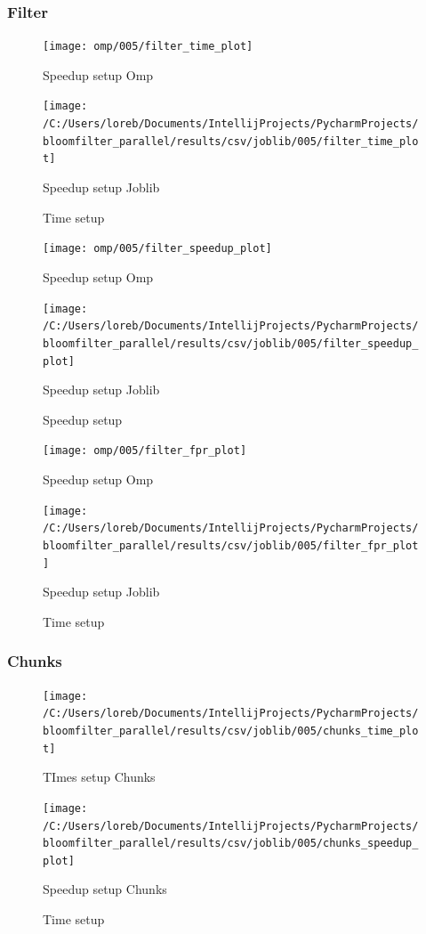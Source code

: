 \documentclass[11pt]{article}
\begin{document}
    \subsubsection{Filter}\label{subsubsec:fpr-005-filter}
    \begin{figure}[H]
        \centering
        \texttt{[image: omp/005/filter\_time\_plot]}
            \caption{Speedup setup Omp}\label{fig:005-filter_time_omp}
        \endminipage\hfill
        \texttt{[image: /C:/Users/loreb/Documents/IntellijProjects/PycharmProjects/bloomfilter\_parallel/results/csv/joblib/005/filter\_time\_plot]}
            \caption{Speedup setup Joblib}\label{fig:005-filter_time_joblib}
        \endminipage\hfill
        \caption{Time setup}
    \end{figure}
    \begin{figure}[H]
        \centering
        \texttt{[image: omp/005/filter\_speedup\_plot]}
            \caption{Speedup setup Omp}\label{fig:005-filter_speedup_omp}
        \endminipage\hfill
        \texttt{[image: /C:/Users/loreb/Documents/IntellijProjects/PycharmProjects/bloomfilter\_parallel/results/csv/joblib/005/filter\_speedup\_plot]}
            \caption{Speedup setup Joblib}\label{fig:005-filter_speedup_joblib}
        \endminipage\hfill
        \caption{Speedup setup}
    \end{figure}
    \begin{figure}[H]
        \centering
        \texttt{[image: omp/005/filter\_fpr\_plot]}
            \caption{Speedup setup Omp}\label{fig:005-filter_fpr_omp}
        \endminipage\hfill
        \texttt{[image: /C:/Users/loreb/Documents/IntellijProjects/PycharmProjects/bloomfilter\_parallel/results/csv/joblib/005/filter\_fpr\_plot]}
            \caption{Speedup setup Joblib}\label{fig:005-filter_fpr_joblib}
        \endminipage\hfill
        \caption{Time setup}
    \end{figure}
    \subsubsection{Chunks}\label{subsubsec:005-chunks}
    \begin{figure}[H]
        \centering
        \texttt{[image: /C:/Users/loreb/Documents/IntellijProjects/PycharmProjects/bloomfilter\_parallel/results/csv/joblib/005/chunks\_time\_plot]}
            \caption{TImes setup Chunks}\label{fig:005-chunks_time}
        \endminipage\hfill
        \texttt{[image: /C:/Users/loreb/Documents/IntellijProjects/PycharmProjects/bloomfilter\_parallel/results/csv/joblib/005/chunks\_speedup\_plot]}
            \caption{Speedup setup Chunks}\label{fig:005-chunks_speedup}
        \endminipage\hfill
        \caption{Time setup}
    \end{figure}
\end{document}
